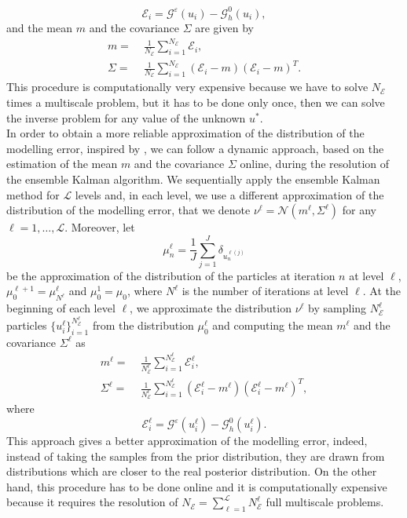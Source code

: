 \documentclass[10pt]{article}
\begin{document}
\[ \mathcal{E}_i = \mathcal{G}^{\varepsilon}(u_i) - \mathcal{G}^0_h(u_i), \]
and the mean $m$ and the covariance $\Sigma$ are given by
\begin{align*}
m = & \; \frac{1}{N_{\mathcal{E}}} \sum_{i=1}^{N_{\mathcal{E}}} \mathcal{E}_i, \\
\Sigma = & \; \frac{1}{N_{\mathcal{E}}} \sum_{i=1}^{N_{\mathcal{E}}} (\mathcal{E}_i - m) (\mathcal{E}_i - m)^T.
\end{align*}
This procedure is computationally very expensive because we have to solve $N_{\mathcal{E}}$ times a multiscale problem, but it has to be done only once, then we can solve the inverse problem for any value of the unknown $u^*$. \\
In order to obtain a more reliable approximation of the distribution of the modelling error, inspired by \cite{CDS18}, we can follow a dynamic approach, based on the estimation of the mean $m$ and the covariance $\Sigma$ online, during the resolution of the ensemble Kalman algorithm. We sequentially apply the ensemble Kalman method for $\mathcal{L}$ levels and, in each level, we use a different approximation of the distribution of the modelling error, that we denote $\nu^{\ell} = \mathcal{N}(m^{\ell}, \Sigma^{\ell})$ for any $\ell = 1, \dots, \mathcal{L}$. Moreover, let
\[ \mu_n^{\ell} = \frac{1}{J} \sum_{j=1}^J \delta_{u^{\ell (j)}_n} \]
be the approximation of the distribution of the particles at iteration $n$ at level $\ell$, $\mu_0^{\ell + 1} = \mu_{N^{\ell}}^{\ell}$ and $\mu_0^1 = \mu_0$, where $N^{\ell}$ is the number of iterations at level $\ell$. At the beginning of each level $\ell$, we approximate the distribution $\nu^{\ell}$ by sampling $N_{\mathcal{E}}^{\ell}$ particles $\{ u_i^{\ell} \}_{i=1}^{N_{\mathcal{E}}^{\ell}}$ from the distribution $\mu_0^{\ell}$ and computing the mean $m^{\ell}$ and the covariance $\Sigma^{\ell}$ as
\begin{align*}
m^{\ell} = & \; \frac{1}{N_{\mathcal{E}}^{\ell}} \sum_{i=1}^{N_{\mathcal{E}}^{\ell}} \mathcal{E}_i^{\ell}, \\
\Sigma^{\ell} = & \; \frac{1}{N_{\mathcal{E}}^{\ell}} \sum_{i=1}^{N_{\mathcal{E}}^{\ell}} (\mathcal{E}_i^{\ell} - m^{\ell}) (\mathcal{E}_i^{\ell} - m^{\ell})^T,
\end{align*}
where
\[ \mathcal{E}_i^{\ell} = \mathcal{G}^{\varepsilon}(u_i^{\ell}) - \mathcal{G}^0_h(u_i^{\ell}). \]
This approach gives a better approximation of the modelling error, indeed, instead of taking the samples from the prior distribution, they are drawn from distributions which are closer to the real posterior distribution. On the other hand, this procedure has to be done online and it is computationally expensive because it requires the resolution of $N_{\mathcal{E}} = \sum_{\ell=1}^{\mathcal{L}} N_{\mathcal{E}}^{\ell}$ full multiscale problems.
\end{document}
